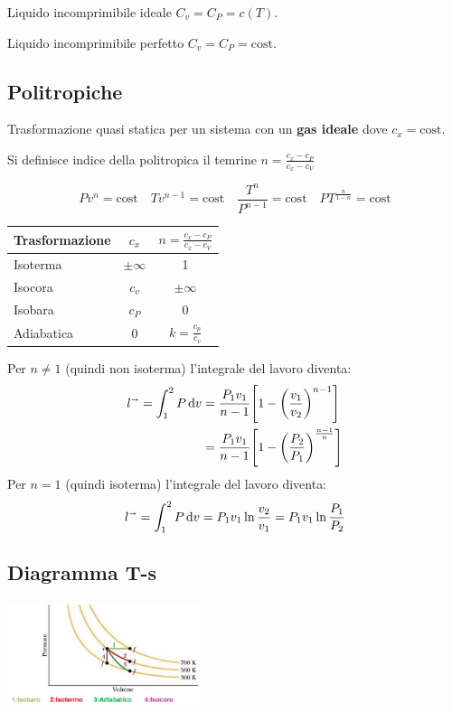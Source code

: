 Liquido incomprimibile ideale $C_v = C_P = c(T)$.

Liquido incomprimibile perfetto $C_v = C_P = \text{cost}$.

\subsection{Politropiche}
Trasformazione quasi statica per un sistema con un \textbf{gas ideale} dove $c_x = \text{cost}$.

Si definisce indice della politropica il temrine $n = \frac{c_x-c_P}{c_x-c_V}$

\[
    Pv^n = \text{cost} \quad Tv^{n-1} = \text{cost} \quad \frac{T^n}{P^{n-1}} = \text{cost} \quad PT^{\frac{n}{1-n}} = \text{cost}
\]

\begin{tabular}{lcc}
    \toprule
    Trasformazione & $c_x$ & $n = \frac{c_x-c_P}{c_x-c_V}$ \\
    \midrule
    Isoterma & $\pm\infty$ & 1 \\
    Isocora & $c_v$ & $\pm\infty$ \\
    Isobara & $c_P$ & 0 \\
    Adiabatica & 0 & $k = \frac{c_p}{c_v}$ \\
    \bottomrule
\end{tabular}

Per $n \ne 1$ (quindi non isoterma) l'integrale del lavoro diventa:
\begin{align*}
    l^\shortrightarrow = \int_1^2 P\dd{v} &= \frac{P_1v_1}{n-1} \qty[1-\qty(\frac{v_1}{v_2})^{n-1}] \\
    &= \frac{P_1v_1}{n-1} \qty[1-\qty(\frac{P_2}{P_1})^{\frac{n-1}{n}}]
\end{align*}
Per $n = 1$ (quindi isoterma) l'integrale del lavoro diventa:
\[ l^\shortrightarrow = \int_1^2 P\dd{v} = P_1v_1\ln{\frac{v_2}{v_1}} = P_1v_1\ln{\frac{P_1}{P_2}} \]

\subsection{Diagramma T-s}

\begin{center}
    \includegraphics[height=3cm]{politropiche.JPG}
\end{center}

